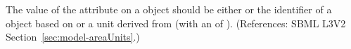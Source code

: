The value of the attribute  on a \Model object should be
either  or the identifier of a \UnitDefinition object
based on  or a unit derived from  (with an
 of ).  (References: SBML L3V2
Section~\ref{sec:model-areaUnits}.)

